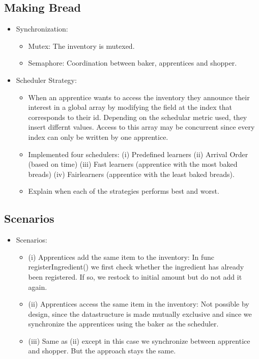 \documentclass[11pt]{article}
\begin{document}
\subsection{Making Bread}
\label{sec:orgaf7ab8d}

\begin{itemize}
\item Synchronization:\\
\begin{itemize}
\item Mutex: The inventory is mutexed.\\
\item Semaphore: Coordination between baker, apprentices and shopper.\\
\end{itemize}
\item Scheduler Strategy:\\
\begin{itemize}
\item When an apprentice wants to access the inventory they announce their interest in a global array by modifying the field at the index that corresponds to their id. Depending on the schedular metric used, they insert differnt values. Access to this array may be concurrent since every index can only be written by one apprentice.\\
\item Implemented four schedulers: (i) Predefined learners (ii) Arrival Order (based on time) (iii) Fast learners (apprentice with the most baked breads) (iv) Fairlearners (apprentice with the least baked breads).\\
\item Explain when each of the strategies performs best and worst.\\
\end{itemize}
\end{itemize}

\subsection{Scenarios}
\label{sec:org9d09e61}
\begin{itemize}
\item Scenarios:\\
\begin{itemize}
\item (i) Apprentices add the same item to the inventory: In func registerIngredient() we first check whether the ingredient has already been registered. If so, we restock to initial amount but do not add it again.\\
\item (ii) Apprentices access the same item in the inventory: Not possible by design, since the datastructure is made mutually exclusive and since we synchronize the apprentices using the baker as the scheduler.\\
\item (iii) Same as (ii) except in this case we synchronize between apprentice and shopper. But the approach stays the same.\\
\end{itemize}
\end{itemize}
\end{document}
